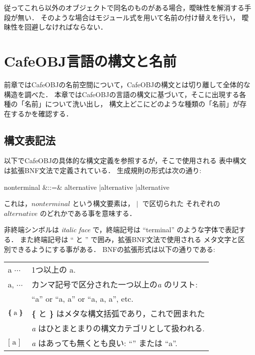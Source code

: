 \documentclass[a4paper,oneside,10pt]{memoir}
\def\sym#1{\textsf{#1}\null}
\def\alt{{\;|\;}}
\def\seqof#1{\mbox{\textbf{\{}}\;{#1}\;\mbox{\textbf{\}}}}
\def\optn#1{\textbf{[}\;{#1}\;\textbf{]}}
\def\synindent{\;\;\;}
\begin{document}
従ってこれら以外のオブジェクトで同名のものがある場合，曖昧性を解消する手段が無い．
そのような場合はモジュール式を用いて名前の付け替えを行い，
曖昧性を回避しなければならない．

\section{CafeOBJ言語の構文と名前}
\label{sec:cafeobj-syntax-and-names}
前章ではCafeOBJの名前空間について，CafeOBJの構文とは切り離して全体的な構造を調べた．
本章ではCafeOBJの言語の構文に基づいて，そこに出現する各種の「名前」について洗い出し，
構文上どこにどのような種類の「名前」が存在するかを確認する．

\subsection{構文表記法}
\label{sec:syntax-notation}
以下でCafeOBJの具体的な構文定義を参照するが，そこで使用される
表中構文は拡張BNF文法で定義されている．
生成規則の形式は次の通り:
\begin{syntax}
\synindent\synindent  nonterminal &::=& alternative \alt alternative \alt \cdots \alt alternative
\end{syntax}
これは，$nonterminal$ という構文要素は，$\alt$ で区切られた
それぞれの $alternative$ のどれかである事を意味する．

非終端シンボルは \textit{italic face} で，終端記号は
``\sym{terminal}'' のような字体で表記する．
また終端記号は `` と '' で囲み，拡張BNF文法で使用される
メタ文字と区別できるようにする事がある．
BNFの拡張形式は以下の通りである:
\begin{center}
\begin{minipage}{0.7\textwidth}
  \begin{tabular}{ll}
    a $\cdots$ & 1つ以上の a. \\
    a, $\cdots$ & カンマ記号で区分された一つ以上の\textit{a} のリスト: \\
    & ``a'' or ``a, a'' or ``a, a, a'', etc. \\
    $\seqof{\textrm{a}}$ & \textbf{\{} と \textbf{\}} はメタな構文括弧であり，これで囲まれた\\
    & \textit{a} はひとまとまりの構文カテゴリとして扱われる. \\
    $\optn{\textrm{a}}$ & \textit{a} はあっても無くとも良い: ``'' または ``a''.
  \end{tabular}
\end{minipage}
\end{center}
\end{document}
